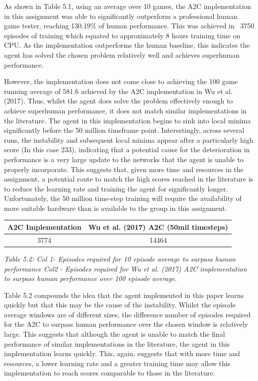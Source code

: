 \documentclass{article}
\begin{document}
As shown in Table 5.1, using an average over 10 games, the A2C implementation in this assignment was able to significantly outperform a professional human game tester, reaching 130.19\% of human performance. This was achieved in ~3750 episodes of training which equated to approximately 8 hours training time on CPU. As the implementation outperforms the human baseline, this indicates the agent has solved the chosen problem relatively well and achieves superhuman performance. 

However, the implementation does not come close to achieving the 100 game running average of 581.6 achieved by the A2C implementation in Wu et al. (2017). Thus, whilst the agent does solve the problem effectively enough to achieve superhuman performance, it does not match similar implementations in the literature. The agent in this implementation begins to sink into local minima significantly before the 50 million timeframe point. Interestingly, across several runs, the instability and subsequent local minima appear after a particularly high score (In this case 233), indicating that a potential cause for the deterioration in performance is a very large update to the networks that the agent is unable to properly incorporate. This suggests that, given more time and resources in the assignment, a potential route to match the high scores reached in the literature is to reduce the learning rate and training the agent for significantly longer. Unfortunately, the 50 million time-step training will require the availability of more suitable hardware than is available to the group in this assignment.

\begin{table}[h!]
\centering
\begin{tabular}{|c | c|} 
 \hline
 A2C Implementation & Wu et al. (2017) A2C (50mil timesteps) \\ [0.5ex] 
 \hline
 3774 & 14464   \\ 
 \hline
\end{tabular}
\end{table}
\emph{Table 5.2: Col 1- Episodes required for 10 episode average to surpass human performance Col2 - Episodes required for Wu et al. (2017) A2C implementation to surpass human performance over 100 episode average.}

Table 5.2 compounds the idea that the agent implemented in this paper learns quickly but that this may be the cause of the instability. Whilst the episode average windows are of different sizes, the difference number of episodes required for the A2C to surpass human performance over the chosen window is relatively large. This suggests that although the agent is unable to match the final performance of similar implementations in the literature, the agent in this implementation learns quickly. This, again, suggests that with more time and resources, a lower learning rate and a greater training time may allow this implementation to reach scores comparable to those in the literature.
\end{document}
